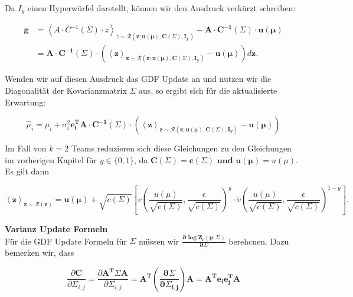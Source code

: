 \documentclass[12pt,a4paper]{scrartcl}
\numberwithin{equation}{section}
\begin{document}
Da $I_y$ einen Hyperwürfel darstellt, können wir den Ausdruck verkürzt schreiben: 

\begin{equation}
\begin{split}
 \mathbf{g} &= \left < A \cdot C^{-1}(\varSigma) \cdot z \right >_{z \sim \mathcal{R}(\mathbf{z;u(\mu), C(\varSigma), I_y})} - \mathbf{A \cdot C^{-1}(\varSigma) \cdot u(\mu)} \\
 &= \mathbf{A \cdot C^{-1}(\varSigma) \cdot \left( \left <z \right >_{z \sim \mathcal{R}(\mathbf{z;u(\mu), C(\varSigma), I_y})} - \mathbf{u(\mu)} \right )} d \mathbf{z}.
\end{split}
 \end{equation}

 Wenden wir auf diesen Ausdruck das GDF Update an und nutzen wir die Diagonalität der Kovarianzmatrix $\mathbf{\varSigma}$ aus, so ergibt sich für die aktualisierte Erwartung: 
 
 \begin{equation}
  \hat \mu_i = \mu_i + \sigma_i^2 \mathbf{e_i^T A \cdot C^{-1}(\varSigma) \cdot \left ( \left < z \right >_{z \sim \mathcal{R}(\mathbf{z;u(\mu), C(\varSigma), I_y})} - u(\mu)  \right )}
 \end{equation}

 Im Fall von $k = 2$ Teams reduzieren sich diese Gleichungen zu den Gleichungen im vorherigen Kapitel für $y \in \{ 0,1 \}$, da $\mathbf{C(\varSigma) = c(\varSigma) \text{ und } u(\mu)} = u(\mu)$. 
 Es gilt dann 
 
 \begin{equation}
  \mathbf{\left < z \right >_{z \sim \mathcal{R}(z)} = u(\mu) + } \sqrt{c(\varSigma)} \left [ v \left( \frac{u(\mu)}{\sqrt{c(\varSigma)}}, \frac{\epsilon}{\sqrt{c(\varSigma)}} \right )^y \cdot \tilde v \left ( \frac{u(\mu)}{\sqrt{c(\varSigma)}}, \frac{\epsilon}{\sqrt{c(\varSigma)}} \right )^{1-y} \right ] .
 \end{equation}

 \textbf{ Varianz Update Formeln	} \\
 Für die GDF Update Formeln für $\varSigma$ müssen wir $\mathbf{\frac{ \partial \log{Z_r(\mu,\varSigma)}}{\partial \varSigma}}$ berehcnen. Dazu bemerken wir, dass 
  
 \begin{equation}
  \frac{\partial \mathbf{C}}{\partial \varSigma_{i,j}} = \frac{\partial \mathbf{A^T \varSigma A}}{\partial \varSigma_{i,j}} = \mathbf{A^T \left ( \frac{\partial \varSigma}{\partial \varSigma_{i,j}} \right ) A = A^T e_i e_j^T A }
 \end{equation}
\end{document}
